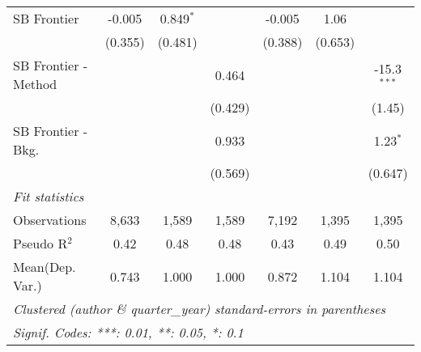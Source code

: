 \begin{tabular}{lcccccc}
   SB Frontier          & -0.005  & 0.849$^{*}$ &         & -0.005  & 1.06    &   \\   
                        & (0.355) & (0.481)     &         & (0.388) & (0.653) &   \\   
   SB Frontier - Method &         &             & 0.464   &         &         & -15.3$^{***}$\\   
                        &         &             & (0.429) &         &         & (1.45)\\   
   SB Frontier - Bkg.   &         &             & 0.933   &         &         & 1.23$^{*}$\\   
                        &         &             & (0.569) &         &         & (0.647)\\   
   \midrule
   \emph{Fit statistics}\\
   Observations         & 8,633   & 1,589       & 1,589   & 7,192   & 1,395   & 1,395\\  
   Pseudo R$^2$         & 0.42    & 0.48        & 0.48    & 0.43    & 0.49    & 0.50\\  
Mean(Dep. Var.) & 0.743 & 1.000 & 1.000 & 0.872 & 1.104 & 1.104 \\
   \midrule \midrule
   \multicolumn{7}{l}{\emph{Clustered (author \& quarter\_year) standard-errors in parentheses}}\\
   \multicolumn{7}{l}{\emph{Signif. Codes: ***: 0.01, **: 0.05, *: 0.1}}\\
\end{tabular}
\par\endgroup
